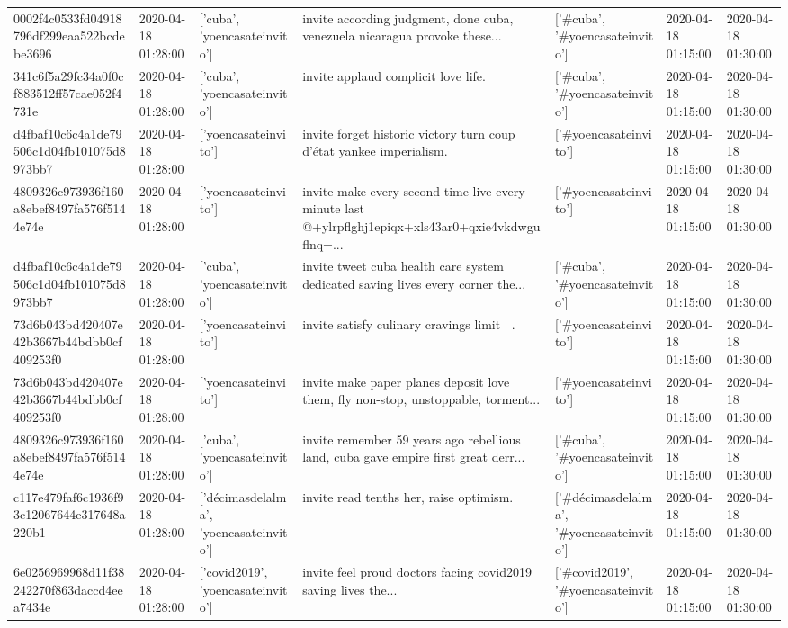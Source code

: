 \begin{tabular}{lllllll}
0002f4c0533fd04918796df299eaa522bcdebe3696 & 2020-04-18 01:28:00 & ['cuba', 'yoencasateinvito'] & invite according judgment, done cuba, venezuela nicaragua provoke these... & ['#cuba', '#yoencasateinvito'] & 2020-04-18 01:15:00 & 2020-04-18 01:30:00 \\
341c6f5a29fc34a0f0cf883512ff57cae052f4731e & 2020-04-18 01:28:00 & ['cuba', 'yoencasateinvito'] & invite applaud complicit love life. & ['#cuba', '#yoencasateinvito'] & 2020-04-18 01:15:00 & 2020-04-18 01:30:00 \\
d4fbaf10c6c4a1de79506c1d04fb101075d8973bb7 & 2020-04-18 01:28:00 & ['yoencasateinvito'] & invite forget historic victory turn coup d'état yankee imperialism. & ['#yoencasateinvito'] & 2020-04-18 01:15:00 & 2020-04-18 01:30:00 \\
4809326c973936f160a8ebef8497fa576f5144e74e & 2020-04-18 01:28:00 & ['yoencasateinvito'] & invite make every second time live every minute last @+ylrpflghj1epiqx+xls43ar0+qxie4vkdwguflnq=... & ['#yoencasateinvito'] & 2020-04-18 01:15:00 & 2020-04-18 01:30:00 \\
d4fbaf10c6c4a1de79506c1d04fb101075d8973bb7 & 2020-04-18 01:28:00 & ['cuba', 'yoencasateinvito'] & invite tweet cuba health care system dedicated saving lives every corner the... & ['#cuba', '#yoencasateinvito'] & 2020-04-18 01:15:00 & 2020-04-18 01:30:00 \\
73d6b043bd420407e42b3667b44bdbb0cf409253f0 & 2020-04-18 01:28:00 & ['yoencasateinvito'] & invite satisfy culinary cravings limit 🤣🤣. & ['#yoencasateinvito'] & 2020-04-18 01:15:00 & 2020-04-18 01:30:00 \\
73d6b043bd420407e42b3667b44bdbb0cf409253f0 & 2020-04-18 01:28:00 & ['yoencasateinvito'] & invite make paper planes deposit love them, fly non-stop, unstoppable, torment... & ['#yoencasateinvito'] & 2020-04-18 01:15:00 & 2020-04-18 01:30:00 \\
4809326c973936f160a8ebef8497fa576f5144e74e & 2020-04-18 01:28:00 & ['cuba', 'yoencasateinvito'] & invite remember 59 years ago rebellious land, cuba gave empire first great derr... & ['#cuba', '#yoencasateinvito'] & 2020-04-18 01:15:00 & 2020-04-18 01:30:00 \\
c117e479faf6c1936f93c12067644e317648a220b1 & 2020-04-18 01:28:00 & ['décimasdelalma', 'yoencasateinvito'] & invite read tenths her, raise optimism. & ['#décimasdelalma', '#yoencasateinvito'] & 2020-04-18 01:15:00 & 2020-04-18 01:30:00 \\
6e0256969968d11f38242270f863daccd4eea7434e & 2020-04-18 01:28:00 & ['covid2019', 'yoencasateinvito'] & invite feel proud doctors facing covid2019 saving lives the... & ['#covid2019', '#yoencasateinvito'] & 2020-04-18 01:15:00 & 2020-04-18 01:30:00 \\

\end{tabular}

